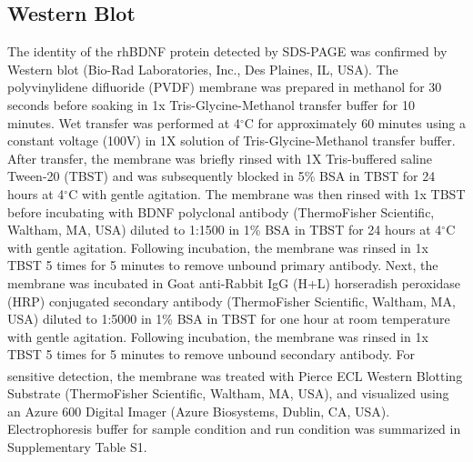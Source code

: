 \documentclass[review]{elsarticle}
\begin{document}
\subsection{Western Blot} 
The identity of the rhBDNF protein detected by SDS-PAGE was confirmed by Western blot (Bio-Rad Laboratories, Inc., Des Plaines, IL, USA). The polyvinylidene difluoride (PVDF) membrane was prepared in methanol for 30 seconds before soaking in 1x Tris-Glycine-Methanol transfer buffer for 10 minutes. Wet transfer was performed at 4$^\circ$C for approximately 60 minutes using a constant voltage (100V) in 1X solution of Tris-Glycine-Methanol transfer buffer. After transfer, the membrane was briefly rinsed with 1X Tris-buffered saline Tween-20 (TBST) and was subsequently blocked in 5\% BSA in TBST for 24 hours at 4$^\circ$C with gentle agitation. The membrane was then rinsed with 1x TBST before incubating with BDNF polyclonal antibody (ThermoFisher Scientific, Waltham, MA, USA) diluted to 1:1500 in 1\% BSA in TBST for 24 hours at 4$^\circ$C with gentle agitation. Following incubation, the membrane was rinsed in 1x TBST 5 times for 5 minutes to remove unbound primary antibody. Next, the membrane was incubated in Goat anti-Rabbit IgG (H+L) horseradish peroxidase (HRP) conjugated secondary antibody (ThermoFisher Scientific, Waltham, MA, USA) diluted to 1:5000 in 1\% BSA in TBST for one hour at room temperature with gentle agitation. Following incubation, the membrane was rinsed in 1x TBST 5 times for 5 minutes to remove unbound secondary antibody. For sensitive detection, the membrane was treated with Pierce\textsuperscript{\texttrademark} ECL Western Blotting Substrate (ThermoFisher Scientific, Waltham, MA, USA), and visualized using an Azure 600 Digital Imager (Azure Biosystems, Dublin, CA, USA). Electrophoresis buffer for sample condition and run condition was summarized in Supplementary Table S1. 
\end{document}
